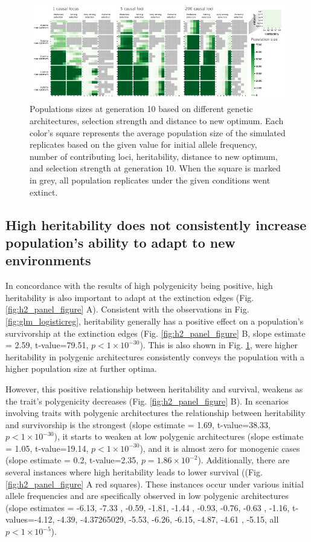 \documentclass{article}
\begin{document}
\begin{figure}[H]
    \centering
    \includegraphics[width=1\textwidth]{figures/pop_size_GEN10.pdf}
    \caption{Populations sizes at generation 10 based on different genetic architectures, selection strength and distance to new optimum. Each color's square represents the average population size of the simulated replicates based on the given value for initial allele frequency, number of contributing loci, heritability, distance to new optimum, and selection strength at generation 10. When the square is marked in grey, all population replicates under the given conditions went extinct.}
    \label{fig:pop_size_poly_gen10}
\end{figure}

\subsection{High heritability does not consistently increase population's ability to adapt to new environments}
In concordance with the results of high polygenicity being positive, high heritability is also  important to adapt at the extinction edges (Fig. \ref{fig:h2_panel_figure} A). Consistent with the observations in Fig. \ref{fig:glm_logisticreg}, heritability generally has a positive effect on a population's survivorship at the extinction edges (Fig. \ref{fig:h2_panel_figure} B, slope estimate = 2.59, t-value=79.51,  $p<1 \times 10^{-30}$). This is also shown in Fig. \ref{fig:pop_size_poly_gen10}, were higher heritability in polygenic architectures consistently conveys the population with a higher population size at further optima.

However, this positive relationship between heritability and survival, weakens as the trait's polygenicity decreases (Fig. \ref{fig:h2_panel_figure} B). In scenarios involving traits with polygenic architectures the relationship between heritability and survivorship is the strongest (slope estimate = 1.69, t-value=38.33,  $p<1 \times 10^{-30}$), it starts to weaken at low polygenic architectures (slope estimate = 1.05, t-value=19.14,  $p<1 \times 10^{-30}$), and it is almost zero for monogenic cases (slope estimate = 0.2, t-value=2.35,  $p=1.86 \times 10^{-2}$). Additionally, there are several instances where high heritability leads to lower survival ((Fig. \ref{fig:h2_panel_figure} A red squares). These instances occur under various initial allele frequencies and are specifically observed in low polygenic architectures (slope estimates = -6.13, -7.33 , -0.59, -1.81, -1.44 , -0.93, -0.76, -0.63 , -1.16, t-values=-4.12, -4.39, -4.37265029, -5.53, -6.26, -6.15, -4.87, -4.61 , -5.15,  all $p<1 \times 10^{-5}$).
\end{document}
